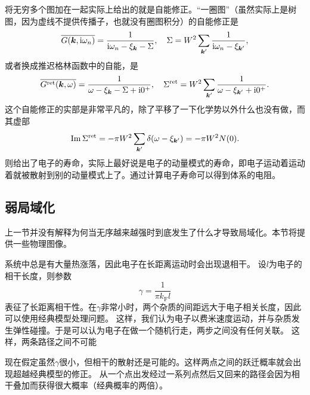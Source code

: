 将无穷多个图加在一起实际上给出的就是自能修正。“一圈图”（虽然实际上是树图，因为虚线不提供传播子，也就没有圈图积分）的自能修正是
\begin{equation}
    \overline{G(\vb*{k}, \mathrm{i} \omega_n)} = \frac{1}{\mathrm{i} \omega_n - \xi_{\vb*{k}} - \Sigma} , \quad \Sigma = W^2 \sum_{\vb*{k}'} \frac{1}{\mathrm{i} \omega_n - \xi_{\vb*{k}'}} ,
\end{equation}
或者换成推迟格林函数中的自能，是
\begin{equation}
    \overline{G^\text{ret}(\vb*{k}, \omega)} = \frac{1}{\omega - \xi_{\vb*{k}} - \Sigma + \mathrm{i} 0^+} , \quad \Sigma^\text{ret} = W^2 \sum_{\vb*{k}'} \frac{1}{\omega - \xi_{\vb*{k}'}  + \mathrm{i} 0^+}.
\end{equation}
这个自能修正的实部是非常平凡的，除了平移了一下化学势以外什么也没有做，而其虚部
\begin{equation}
    \Im \Sigma^\text{ret} = - \pi W^2 \sum_{\vb*{k}'} \delta(\omega - \xi_{\vb*{k}'}) = - \pi W^2 N(0).
\end{equation}
则给出了电子的寿命，实际上最好说是电子的动量模式的寿命，即电子运动着运动着就被散射到别的动量模式上了。通过计算电子寿命可以得到体系的电阻。

\subsection{弱局域化}

上一节并没有解释为何当无序越来越强时到底发生了什么才导致局域化。本节将提供一些物理图像。

系统中总是有大量热涨落，因此电子在长距离运动时会出现退相干。
设$l$为电子的相干长度，则参数
\begin{equation}
    \gamma = \frac{1}{\pi k_\text{F} l}
\end{equation}
表征了长距离相干性。在$\gamma$非常小时，两个杂质的间距远大于电子相关长度，因此可以使用经典模型处理问题。
这样，我们认为电子以费米速度运动，并与杂质发生弹性碰撞。于是可以认为电子在做一个随机行走，两步之间没有任何关联。
这样，两条路径之间不可能

现在假定虽然$\gamma$很小，但相干的散射还是可能的。这样两点之间的跃迁概率就会出现超越经典模型的修正。
从一个点出发经过一系列点然后又回来的路径会因为相干叠加而获得很大概率（经典概率的两倍）。

